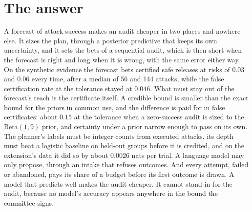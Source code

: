 \section{The answer}

A forecast of attack success makes an audit cheaper in two places and nowhere else. It sizes the
plan, through a posterior predictive that keeps its own uncertainty, and it sets the bets of a
sequential audit, which is then short when the forecast is right and long when it is wrong, with
the same error either way. On the synthetic evidence the forecast bets certified safe releases at
risks of $0.03$ and $0.06$ every time, after a median of 56 and 144 attacks, while the false
certification rate at the tolerance stayed at $0.046$. What must stay out of the forecast's reach is
the certificate itself. A credible bound is smaller than the exact bound for the priors in common
use, and the difference is paid for in false certificates: about $0.15$ at the tolerance when a
zero-success audit is sized to the $\mathrm{Beta}(1,9)$ prior, and certainty under a prior narrow enough to
pass on its own. The planner's labels must be integer counts from executed attacks, its depth must
beat a logistic baseline on held-out groups before it is credited, and on the extension's data it
did so by about $0.0026$ nats per trial. A language model may only propose, through an intake that
refuses outcomes. And every attempt, failed or abandoned, pays its share of a budget before its
first outcome is drawn. A model that predicts well makes the audit cheaper. It cannot stand in for
the audit, because no model's accuracy appears anywhere in the bound the committee signs.

